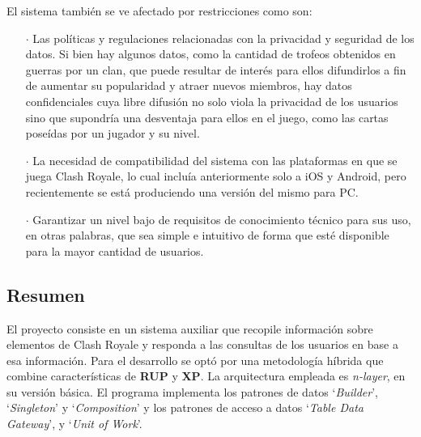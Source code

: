 El sistema también se ve afectado por restricciones como son:

\begin{enumerate}
  \item[\(\cdot\)] Las políticas y regulaciones relacionadas con la privacidad y seguridad de los datos. Si bien hay algunos datos, como la cantidad de trofeos obtenidos en guerras por un clan, que puede resultar de interés para ellos difundirlos a fin de aumentar su popularidad y atraer nuevos miembros, hay datos confidenciales cuya libre difusión no solo viola la privacidad de los usuarios sino que supondría una desventaja para ellos en el juego, como las cartas poseídas por un jugador y su nivel.
  \item[\(\cdot\)] La necesidad de compatibilidad del sistema con las plataformas en que se juega Clash Royale, lo cual incluía anteriormente solo a iOS y Android, pero recientemente se está produciendo una versión del mismo para PC.
  \item[\(\cdot\)] Garantizar un nivel bajo de requisitos de conocimiento técnico para sus uso, en otras palabras, que sea simple e intuitivo de forma que esté disponible para la mayor cantidad de usuarios. 
\end{enumerate}

\subsection{Resumen}

El proyecto consiste en un sistema auxiliar que recopile información sobre elementos de Clash Royale y responda a las consultas de los usuarios en base a esa información. Para el desarrollo se optó por una metodología híbrida que combine características de \textbf{RUP} y \textbf{XP}. La arquitectura empleada es \textit{n-layer}, en su versión básica. El programa implementa los patrones de datos `\textit{Builder}', `\textit{Singleton}' y `\textit{Composition}' y los patrones de acceso a datos `\textit{Table Data Gateway}', y `\textit{Unit of Work}'.

